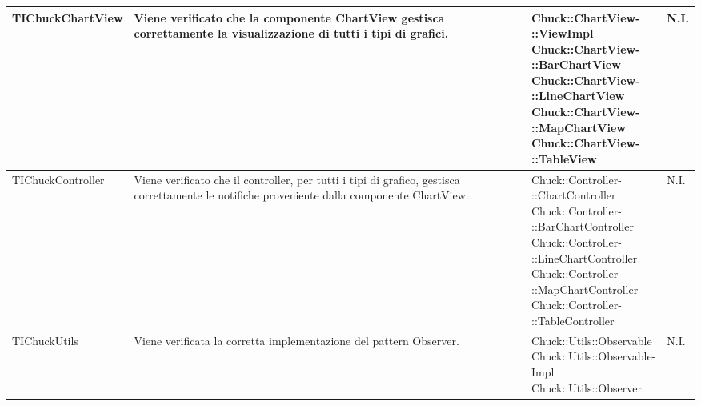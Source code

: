 \begin{longtabu}{| X | X | X[0.9] | X[0.3] |}
	TIChuckChartView
				&
Viene verificato che la componente ChartView gestisca correttamente la visualizzazione di tutti i tipi di grafici.
			& \parbox[t]{0.6\textwidth}{
Chuck::ChartView-\\::ViewImpl\\
Chuck::ChartView-\\::BarChartView\\
Chuck::ChartView-\\::LineChartView\\
Chuck::ChartView-\\::MapChartView\\
Chuck::ChartView-\\::TableView}
			& N.I.
			\\ \hline



	TIChuckController
				&
Viene verificato che il controller, per tutti i tipi di grafico, gestisca correttamente le notifiche proveniente dalla componente ChartView.
			& \parbox[t]{0.6\textwidth}{
Chuck::Controller-\\::ChartController\\
Chuck::Controller-\\::BarChartController\\
Chuck::Controller-\\::LineChartController\\
Chuck::Controller-\\::MapChartController\\
Chuck::Controller-\\::TableController}
			& N.I.
			\\ \hline



	TIChuckUtils &
Viene verificata la corretta implementazione del pattern Observer.
			& \parbox[t]{0.6\textwidth}{
Chuck::Utils::Observable\\
Chuck::Utils::Observable-\\Impl\\
Chuck::Utils::Observer}
			& N.I.
			\\ \hline











\end{longtabu}
